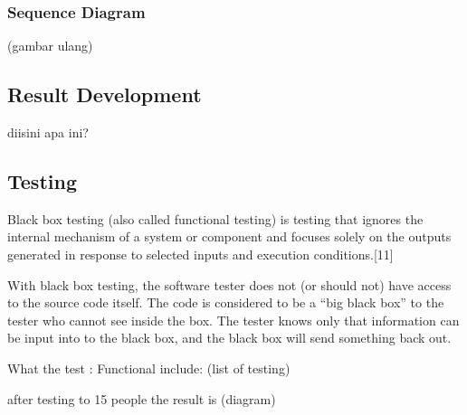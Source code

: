 \documentclass[conference, letterpaper]{IEEEtran}
\begin{document}
\subsubsection{Sequence Diagram}
(gambar ulang)

\subsection{Result Development}
diisini apa ini?

\subsection{Testing}
Black box testing (also called functional testing) is testing that ignores the internal mechanism of a system or component and focuses solely on the outputs generated in response to selected inputs and execution conditions.[11]

With black box testing, the software tester does not (or should not) have access to the source code itself. The code is considered to be a “big black box” to the tester who cannot see inside the box. The tester knows only that information can be input into to the black box, and the black box will send something back out.

What the test :
Functional include: (list of testing)

after testing to 15 people the result is
(diagram)


%
%
\end{document}
